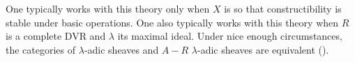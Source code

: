 \begin{definition}
One typically works with this theory only when $X$ is  so that constructibility is stable under basic operations. One also typically works with this theory when $R$ is a complete DVR and $\lambda$ its maximal ideal.
Under nice enough circumstances, the categories of $\lambda$-adic sheaves and $A-R$ $\lambda$-adic sheaves are equivalent ().

\end{definition}
